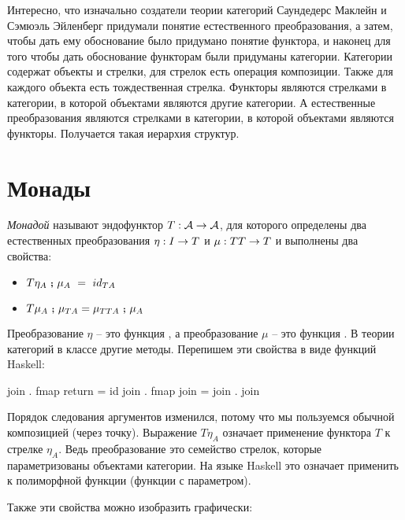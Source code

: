 Интересно, что изначально создатели теории категорий Саундедерс Маклейн
и Сэмюэль Эйленберг придумали понятие естественного преобразования, а
затем, чтобы дать ему обоснование было придумано понятие функтора, и
наконец для того чтобы дать обоснование функторам были придуманы
категории. Категории содержат объекты и стрелки, для стрелок есть
операция композиции. Также для каждого объекта есть тождественная
стрелка. Функторы являются стрелками в категории, в которой объектами
являются другие категории. А естественные преобразования являются
стрелками в категории, в которой объектами являются функторы. Получается
такая иерархия структур.

\section{Монады}

 \emph{Монадой} называют эндофунктор
$T:\mathcal{A} \rightarrow \mathcal{A}$, для которого определены два естественных
преобразования $\eta : I \rightarrow T$ и $\mu : TT \rightarrow T$ и выполнены два
свойства:

\begin{itemize}
\item
  $T \eta_A \Co \mu_{A} \ =\ id_{TA}$
\item
  $T \mu_A \footnotesize\textbf{~;~}\normalsize \mu_{TA} = \mu_{TTA} \footnotesize\textbf{~;~}\normalsize \mu_A$
\end{itemize}

Преобразование $\eta$ -- это функция , а преобразование $\mu$
-- это функция . В теории категорий в классе  другие
методы. Перепишем эти свойства в виде функций Haskell:


\begin{code}
join . fmap return   = id
join . fmap join     = join . join
\end{code}

Порядок следования аргументов изменился, потому что мы пользуемся
обычной композицией (через точку). Выражение $T \eta_A$ означает
применение функтора $T$ к стрелке $\eta_A$. Ведь преобразование это
семейство стрелок, которые параметризованы объектами категории. На языке
Haskell это означает применить  к полиморфной функции (функции
с параметром).

Также эти свойства можно изобразить графически:

\begin{centering}



\end{centering}


